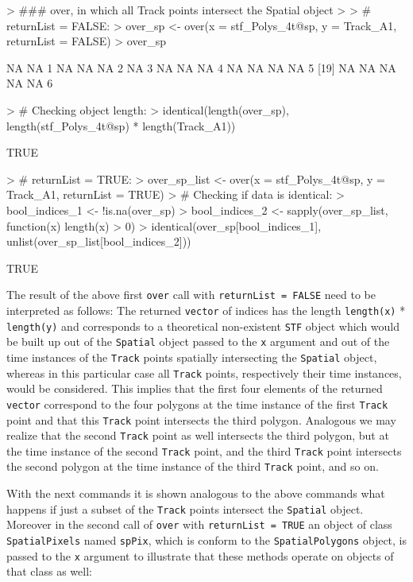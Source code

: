\documentclass[12pt, oneside, a4paper]{scrbook}
\let\code=\texttt
\begin{document}
\begin{small}
\begin{Schunk}
\begin{Sinput}
> ### over, in which all Track points intersect the Spatial object
> 
> # returnList = FALSE:
> over_sp <- over(x = stf_Polys_4t@sp, y = Track_A1, returnList = FALSE)
> over_sp
\end{Sinput}
\begin{Soutput}
 [1] NA NA  1 NA NA NA  2 NA  3 NA NA NA  4 NA NA NA NA  5
[19] NA NA NA NA NA  6
\end{Soutput}
\begin{Sinput}
> # Checking object length:
> identical(length(over_sp), length(stf_Polys_4t@sp) * length(Track_A1))
\end{Sinput}
\begin{Soutput}
[1] TRUE
\end{Soutput}
\begin{Sinput}
> # returnList = TRUE:
> over_sp_list <- over(x = stf_Polys_4t@sp, y = Track_A1, returnList = TRUE)
> # Checking if data is identical:
> bool_indices_1 <- !is.na(over_sp)
> bool_indices_2 <- sapply(over_sp_list, function(x) length(x) > 0)
> identical(over_sp[bool_indices_1], unlist(over_sp_list[bool_indices_2]))
\end{Sinput}
\begin{Soutput}
[1] TRUE
\end{Soutput}
\end{Schunk}
\end{small}

The result of the above first \code{over} call with \code{returnList = FALSE} need to be interpreted as follows: 
The returned \code{vector} of indices has the length \code{length(x)} * \code{length(y)} and corresponds to a theoretical non-existent \code{STF} object which would be built up out of the \code{Spatial} object passed to the \code{x} argument and out of the time instances of the \code{Track} points spatially intersecting the \code{Spatial} object, whereas in this particular case all \code{Track} points, respectively their time instances, would be considered.
This implies that the first four elements of the returned \code{vector} correspond to the four polygons at the time instance of the first \code{Track} point and that this \code{Track} point intersects the third polygon. 
Analogous we may realize that the second \code{Track} point as well intersects the third polygon, but at the time instance of the second \code{Track} point, and the third \code{Track} point intersects the second polygon at the time instance of the third \code{Track} point, and so on.
\par\medskip
With the next commands it is shown analogous to the above commands what happens if just a subset of the \code{Track} points intersect the \code{Spatial} object. 
Moreover in the second call of \code{over} with \code{returnList = TRUE} an object of class \code{SpatialPixels} named \code{spPix}, which is conform to the \code{SpatialPolygons} object, is passed to the \code{x} argument to illustrate that these methods operate on objects of that class as well:
\end{document}
